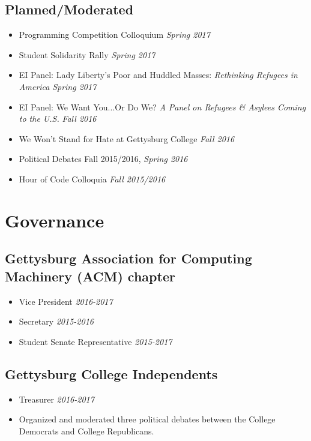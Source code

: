 \documentclass[11pt]{article}
\begin{document}
\subsection*{Planned/Moderated}
\begin{itemize}[noitemsep]
	\item Programming Competition Colloquium \hfill \textit{Spring 2017}
	\item Student Solidarity Rally \hfill \textit{Spring 2017}
	\item EI Panel: Lady Liberty's Poor and Huddled Masses: \textit{Rethinking Refugees in America} \hfill \textit{Spring 2017}
	\item EI Panel: We Want You...Or Do We? \textit{A Panel on Refugees \& Asylees Coming to the U.S.} \hfill \textit{Fall 2016}
	\item We Won't Stand for Hate at Gettysburg College \hfill \textit{Fall 2016}
	\item Political Debates \hfill Fall 2015/2016, \textit{Spring 2016}
	\item Hour of Code Colloquia \hfill \textit{Fall 2015/2016}
\end{itemize}

\section*{Governance}
\subsection*{Gettysburg Association for Computing Machinery (ACM) chapter}
\begin{itemize}[noitemsep]
	\item Vice President \hfill \textit{2016-2017}
	\item Secretary \hfill \textit{2015-2016}
	\item Student Senate Representative \hfill \textit{2015-2017}
\end{itemize}
 
\subsection*{Gettysburg College Independents} 
\begin{itemize}[noitemsep]
	\item Treasurer \hfill \textit{2016-2017}
    \item Organized and moderated three political debates between the College Democrats and College Republicans. 
\end{itemize}
\end{document}
